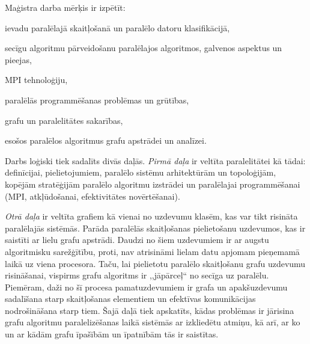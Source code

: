 
Maģistra darba mērķis ir izpētīt:
\begin{dotlist}
	\item ievadu paralēlajā skaitļošanā un paralēlo datoru klasifikācijā,
	\item secīgu algoritmu pārveidošanu paralēlajos algoritmos, galvenos aspektus un pieejas,
	\item MPI tehnoloģiju,
	\item paralēlās programmēšanas problēmas un grūtības,
	\item grafu un paralelitātes sakarības,
	\item esošos paralēlos algoritmus grafu apstrādei un analīzei.
\end{dotlist}

Darbs loģiski tiek sadalīts divās daļās. \emph{Pirmā daļa} ir veltīta paralelitātei kā
tādai: definīcijai, pielietojumiem, paralēlo sistēmu arhitektūrām un topoloģijām,
kopējām stratēģijām paralēlo algoritmu izstrādei un paralēlajai programmēšanai
(MPI, atkļūdošanai, efektivitātes novērtēšanai).

\emph{Otrā daļa} ir veltīta grafiem kā vienai no uzdevumu klasēm, kas var tikt
risināta paralēlajās sistēmās. Parāda paralēlās skaitļošanas pielietošanu uzdevumos,
kas ir saistīti ar lielu grafu apstrādi. Daudzi no šiem uzdevumiem ir ar augstu
algoritmisku sarežģītību, proti, nav atrisināmi lielam datu apjomam pieņemamā
laikā uz viena procesora. Taču, lai pielietotu paralēlo skaitļošanu grafu uzdevumu
risināšanai, vispirms grafu algoritms ir ,,jāpārceļ`` no secīga uz paralēlu. Piemēram,
daži no šī procesa pamatuzdevumiem ir grafa un apakšuzdevumu sadalīšana starp
skaitļošanas elementiem un efektīvas komunikācijas nodrošināšana starp tiem. Šajā
daļā tiek apskatīts, kādas problēmas ir jārisina grafu algoritmu paralelizēšanas
laikā sistēmās ar izkliedētu atmiņu, kā arī, ar ko un ar kādām grafu īpašībām un
īpatnībām tās ir saistītas.

